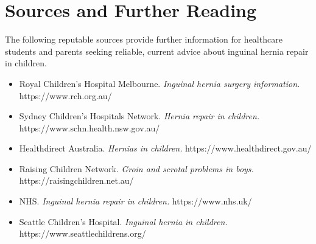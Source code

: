 \section*{Sources and Further Reading}
The following reputable sources provide further information for healthcare students and parents seeking reliable, current advice about inguinal hernia repair in children.
\begin{itemize}
    \item Royal Children's Hospital Melbourne. \textit{Inguinal hernia surgery information.} https://www.rch.org.au/
    \item Sydney Children's Hospitals Network. \textit{Hernia repair in children.} https://www.schn.health.nsw.gov.au/
    \item Healthdirect Australia. \textit{Hernias in children.} https://www.healthdirect.gov.au/
    \item Raising Children Network. \textit{Groin and scrotal problems in boys.} https://raisingchildren.net.au/
    \item NHS. \textit{Inguinal hernia repair in children.} https://www.nhs.uk/
    \item Seattle Children's Hospital. \textit{Inguinal hernia in children.} https://www.seattlechildrens.org/
\end{itemize}
